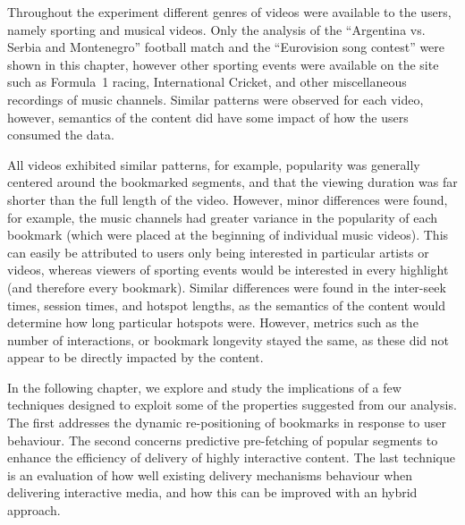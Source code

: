 Throughout the experiment different genres of videos were available to the users, namely sporting and musical videos. Only the analysis of the ``Argentina vs. Serbia and Montenegro'' football match and the ``Eurovision song contest'' were shown in this chapter, however other sporting events were available on the site such as Formula~1 racing, International Cricket, and other miscellaneous recordings of music channels. Similar patterns were observed for each video, however, semantics of the content did have some impact of how the users consumed the data.

All videos exhibited similar patterns, for example, popularity was generally centered around the bookmarked segments, and that the viewing duration was far shorter than the full length of the video. However, minor differences were found, for example, the music channels had greater variance in the popularity of each bookmark (which were placed at the beginning of individual music videos). This can easily be attributed to users only being interested in particular artists or videos, whereas viewers of sporting events would be interested in every highlight (and therefore every bookmark). Similar differences were found in the inter-seek times, session times, and hotspot lengths, as the semantics of the content would determine how long particular hotspots were. However, metrics such as the number of interactions, or bookmark longevity stayed the same, as these did not appear to be directly impacted by the content.

In the following chapter, we explore and study the implications of a few techniques designed to exploit some of the properties suggested from our analysis. The first addresses the dynamic re-positioning of bookmarks in response to user behaviour. The second concerns predictive pre-fetching of popular segments to enhance the efficiency of delivery of highly interactive content. The last technique is an evaluation of how well existing delivery mechanisms behaviour when delivering interactive media, and how this can be improved with an hybrid approach.
